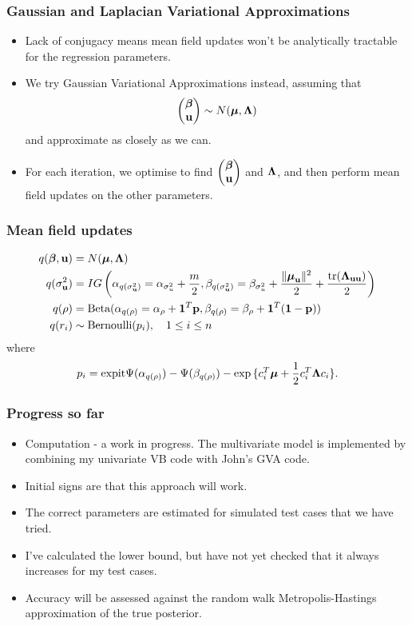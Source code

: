 \documentclass{beamer}
\begin{document}
\begin{frame}
\frametitle{Gaussian and Laplacian Variational Approximations}
\begin{itemize}
\item Lack of conjugacy means mean field updates won't be analytically tractable for the regression parameters.
\item We try Gaussian Variational Approximations instead, assuming that
$$
\begin{pmatrix}
{\boldsymbol\beta} \\
{\bf u}
\end{pmatrix}
\sim N({\boldsymbol \mu}, {\boldsymbol \Lambda})
$$
and approximate as closely as we can.
\item For each iteration, we optimise to find
$\begin{pmatrix}
{\boldsymbol\beta} \\
{\bf u}
\end{pmatrix}
$ and ${\boldsymbol \Lambda}$,
and then perform mean field updates on the other parameters.
\end{itemize}
\end{frame}

\begin{frame}
\frametitle{Mean field updates}
\begin{align*}
q({\boldsymbol \beta}, {\bf u}) &= N({\boldsymbol \mu}, {\boldsymbol \Lambda}) \\
q(\sigma_{{\bf u}}^2) &= IG\left(\alpha_{q(\sigma_{{\bf u}}^2)} = \alpha_{\sigma_u^2} + \frac{m}{2}, \beta_{q(\sigma_{{\bf u}}^2)} = \beta_{\sigma_u^2} + \frac{\|{\boldsymbol \mu}_{\bf u}\|^2}{2} + \frac{\text{tr}({\boldsymbol \Lambda}_{{\bf u}{\bf u}})}{2}\right) \\
q(\rho) &= \text{Beta}(\alpha_{q(\rho)} = \alpha_\rho + {\bf 1}^T{\bf p}, \beta_{q(\rho)} = \beta_\rho + {\bf 1}^T({\bf 1} - {\bf p})) \\
q(r_i) & \sim \text{Bernoulli}{(p_i)}, \ \ \ 1 \leq i \leq n
\end{align*}
where
$$
p_i = \text{expit} \Psi{(\alpha_{q(\rho)})} - \Psi{(\beta_{q(\rho)})} - \exp{\{c_i^T{\boldsymbol\mu}+ {\frac{1}{2}}c_i^T {\boldsymbol\Lambda}c_i\}}.
$$
\end{frame}

\begin{frame}
\frametitle{Progress so far}
\begin{itemize}
\item Computation - a work in progress. The multivariate model is
implemented by combining my univariate VB code with John's GVA code.
\item Initial signs are that this approach will work.
\item The correct parameters are estimated for simulated test cases
that we have tried.
\item I've calculated the lower bound, but have not yet checked that it
always increases for my test cases.
\item Accuracy will be assessed against the random walk Metropolis-Hastings approximation of the true posterior.
\end{itemize}
\end{frame}
\end{document}
